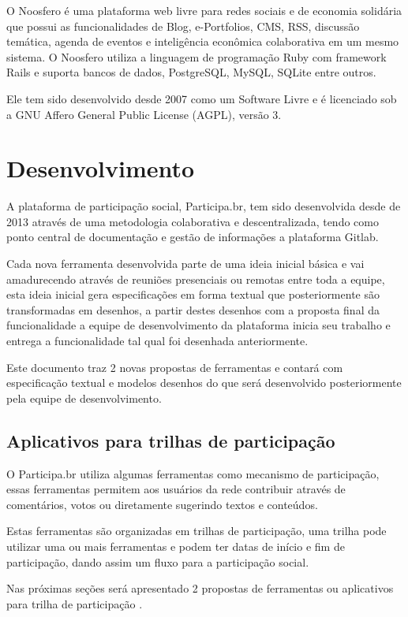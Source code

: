 \documentclass[12pt]{article}
\begin{document}
O Noosfero é uma plataforma web livre para redes sociais e de economia
solidária que possui as funcionalidades de Blog, e-Portfolios, CMS, RSS,
discussão temática, agenda de eventos e inteligência econômica colaborativa
em um mesmo sistema. O Noosfero utiliza a linguagem de programação Ruby com
framework Rails e suporta bancos de dados, PostgreSQL, MySQL, SQLite entre
outros.

Ele tem sido desenvolvido desde 2007 como um Software Livre e é licenciado sob
a GNU Affero General Public License (AGPL), versão 3.

\section{Desenvolvimento}

A plataforma de participação social, Participa.br, tem sido desenvolvida desde
de 2013 através de uma metodologia colaborativa e descentralizada, tendo como
ponto central de documentação e gestão de informações a plataforma
Gitlab\cite{gitlab}.

Cada nova ferramenta desenvolvida parte de uma ideia inicial básica e vai
amadurecendo através de reuniões presenciais ou remotas entre toda a equipe,
esta ideia inicial gera especificações em forma textual que posteriormente são
transformadas em desenhos, a partir destes desenhos com a proposta final da
funcionalidade a equipe de desenvolvimento da plataforma inicia seu trabalho e
entrega a funcionalidade tal qual foi desenhada anteriormente.

Este documento traz 2 novas propostas de ferramentas e contará com
especificação textual e modelos desenhos do que será desenvolvido
posteriormente pela equipe de desenvolvimento.

\subsection{Aplicativos para trilhas de participação}
 
O Participa.br utiliza algumas ferramentas como mecanismo de participação,
essas ferramentas permitem aos usuários da rede contribuir através de
comentários, votos ou diretamente sugerindo textos e conteúdos.

Estas ferramentas são organizadas em trilhas de participação, uma trilha
pode utilizar uma ou mais ferramentas e podem ter datas de início e fim de
participação, dando assim um fluxo para a participação social.

Nas próximas seções será apresentado 2 propostas de ferramentas ou aplicativos
para trilha de participação .
\end{document}
